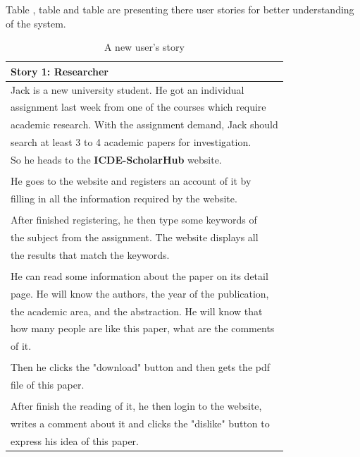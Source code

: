 \documentclass[sigconf, nonacm]{../tex_template/acmart}
\begin{document}
Table , table  and table  are presenting there user stories for better understanding of the system.

\begin{table}[h!]
	\begin{tabular}{ l }
		\hline
		\textbf{Story 1: Researcher}                                  \\
		\hline
		Jack is a new university student. He got an individual        \\
		assignment last week from one of the courses which require    \\
		academic research. With the assignment demand, Jack should    \\
		search at least 3 to 4 academic papers for investigation.     \\
		So he heads to the \textbf{ICDE-ScholarHub} website.          \\
		\\
		He goes to the website and registers an account of it by      \\
		filling in all the information required by the website.       \\
		\\
		After finished registering, he then type some keywords of     \\
		the subject from the assignment. The website displays all     \\
		the results that match the keywords.                          \\
		\\
		He can read some information about the paper on its detail    \\
		page. He will know the authors, the year of the publication,  \\
		the academic area, and the abstraction. He will know that     \\
		how many people are like this paper, what are the comments    \\
		of it.                                                        \\
		\\
		Then he clicks the "download" button and then gets the pdf    \\
		file of this paper.                                           \\
		\\
		After finish the reading of it, he then login to the website, \\
		writes a comment about it and clicks the "dislike" button to  \\
		express his idea of this paper.                               \\
		\hline
	\end{tabular}
	\caption{A new user's story}
	\label{table:1}
\end{table}
\end{document}

